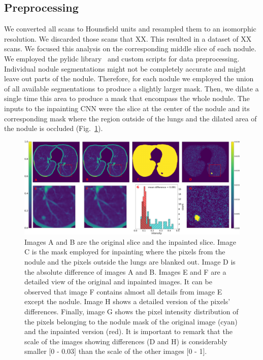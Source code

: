 \documentclass[runningheads]{llncs}
\begin{document}
\subsection{Preprocessing}
We converted all scans to Hounsfield units and resampled them to an isomorphic resolution. We discarded those scans that XX. This resulted in a dataset of XX scans. We focused this analysis on the corresponding middle slice of each nodule. We employed the pylidc library~\cite{pylidc} and custom scripts for data preprocessing. Individual nodule segmentations might not be completely accurate and might leave out parts of the nodule. Therefore, for each nodule we employed the union of all available segmentations to produce a slightly larger mask. Then, we dilate a single time this area to produce a mask that encompass the whole nodule. The inputs to the inpainting CNN were the slice at the center of the nodule and its corresponding mask where the region outside of the lungs and the dilated area of the nodule is occluded (Fig.~\ref{fig1}).

\begin{figure}
\includegraphics[width=\textwidth]{inpainting-difference-caption.png}
\caption{Images A and B are the original slice and the inpainted slice. Image C is the mask employed for inpainting where the pixels from the nodule and the pixels outside the lungs are blanked out. Image D is the absolute difference of images A and B. Images E and F are a detailed view of the original and inpainted images. It can be observed that image F contains almost all details from image E except the nodule. Image H shows a detailed version of the pixels' differences. Finally, image G shows the pixel intensity distribution of the pixels belonging to the nodule mask of the original image (cyan) and the inpainted version (red). It is important to remark that the scale of the images showing differences (D and H) is considerably smaller [0 - 0.03] than the scale of the other images [0 - 1].} \label{fig1}
\end{figure}
\end{document}
